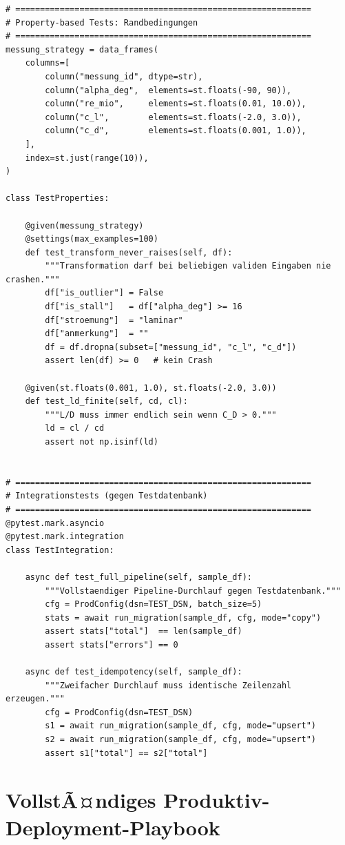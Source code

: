 ﻿\documentclass[12pt,a4paper]{report}
\theoremstyle{definition}
\theoremstyle{remark}
\begin{document}
\begin{lstlisting}[style=python, caption={test\_etl.py: VollstÃ¤ndige Testsuite mit pytest und hypothesis}]
# ============================================================
# Property-based Tests: Randbedingungen
# ============================================================
messung_strategy = data_frames(
    columns=[
        column("messung_id", dtype=str),
        column("alpha_deg",  elements=st.floats(-90, 90)),
        column("re_mio",     elements=st.floats(0.01, 10.0)),
        column("c_l",        elements=st.floats(-2.0, 3.0)),
        column("c_d",        elements=st.floats(0.001, 1.0)),
    ],
    index=st.just(range(10)),
)

class TestProperties:

    @given(messung_strategy)
    @settings(max_examples=100)
    def test_transform_never_raises(self, df):
        """Transformation darf bei beliebigen validen Eingaben nie crashen."""
        df["is_outlier"] = False
        df["is_stall"]   = df["alpha_deg"] >= 16
        df["stroemung"]  = "laminar"
        df["anmerkung"]  = ""
        df = df.dropna(subset=["messung_id", "c_l", "c_d"])
        assert len(df) >= 0   # kein Crash

    @given(st.floats(0.001, 1.0), st.floats(-2.0, 3.0))
    def test_ld_finite(self, cd, cl):
        """L/D muss immer endlich sein wenn C_D > 0."""
        ld = cl / cd
        assert not np.isinf(ld)


# ============================================================
# Integrationstests (gegen Testdatenbank)
# ============================================================
@pytest.mark.asyncio
@pytest.mark.integration
class TestIntegration:

    async def test_full_pipeline(self, sample_df):
        """Vollstaendiger Pipeline-Durchlauf gegen Testdatenbank."""
        cfg = ProdConfig(dsn=TEST_DSN, batch_size=5)
        stats = await run_migration(sample_df, cfg, mode="copy")
        assert stats["total"]  == len(sample_df)
        assert stats["errors"] == 0

    async def test_idempotency(self, sample_df):
        """Zweifacher Durchlauf muss identische Zeilenzahl erzeugen."""
        cfg = ProdConfig(dsn=TEST_DSN)
        s1 = await run_migration(sample_df, cfg, mode="upsert")
        s2 = await run_migration(sample_df, cfg, mode="upsert")
        assert s1["total"] == s2["total"]
\end{lstlisting}

\chapter{VollstÃ¤ndiges Produktiv-Deployment-Playbook}
\label{sec:playbook}
\end{document}
